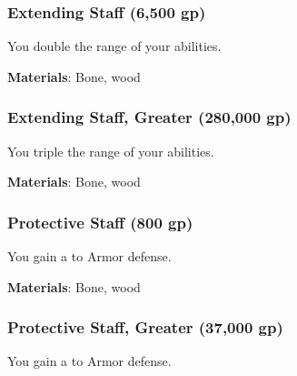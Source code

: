 
\lowercase{\hypertarget{item:Extending Staff}{}}\label{item:Extending Staff}
\hypertarget{item:Extending Staff}{\subsubsection{Extending Staff\hfill{} (6,500 gp)}}

You double the range of your  abilities.



\vspace{0.25em}
\textbf{Materials}: Bone, wood


\lowercase{\hypertarget{item:Extending Staff, Greater}{}}\label{item:Extending Staff, Greater}
\hypertarget{item:Extending Staff, Greater}{\subsubsection{Extending Staff, Greater\hfill{} (280,000 gp)}}

You triple the range of your  abilities.



\vspace{0.25em}
\textbf{Materials}: Bone, wood


\lowercase{\hypertarget{item:Protective Staff}{}}\label{item:Protective Staff}
\hypertarget{item:Protective Staff}{\subsubsection{Protective Staff\hfill{} (800 gp)}}

You gain a   to Armor defense.



\vspace{0.25em}
\textbf{Materials}: Bone, wood


\lowercase{\hypertarget{item:Protective Staff, Greater}{}}\label{item:Protective Staff, Greater}
\hypertarget{item:Protective Staff, Greater}{\subsubsection{Protective Staff, Greater\hfill{} (37,000 gp)}}

You gain a   to Armor defense.



